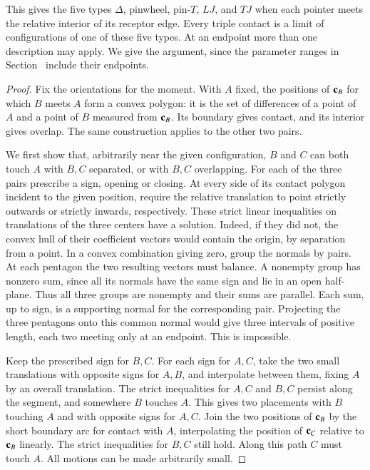 This gives the five types $\Delta$, pinwheel, pin-$T$, $LJ$, and $TJ$
when each pointer meets the relative interior of its receptor edge.
Every triple contact is a limit of configurations of one of these
five types. At an endpoint more than one description may apply.
We give the argument, since the parameter ranges in
Section~ include their endpoints.

\begin{proof}
Fix the orientations for the moment. With $A$ fixed, the positions of
${\mathbf c}_B$ for which $B$ meets $A$ form a convex polygon: it is the set
of differences of a point of $A$ and a point of $B$ measured from
${\mathbf c}_B$. Its boundary gives contact, and its interior gives overlap.
The same construction applies to the other two pairs.

We first show that, arbitrarily near the given configuration, $B$ and
$C$ can both touch $A$ with $B,C$ separated, or with $B,C$ overlapping.
For each of the three pairs prescribe a sign, opening or closing.
At every side of its contact polygon incident to the given position,
require the relative translation to point strictly outwards or strictly
inwards, respectively. These strict linear inequalities on translations
of the three centers have a solution. Indeed, if they did not, the
convex hull of their coefficient vectors would contain the origin, by
separation from a point. In a convex combination giving zero, group
the normals by pairs. At each pentagon the two resulting vectors must
balance. A nonempty group has nonzero sum, since all its normals have
the same sign and lie in an open half-plane. Thus all three groups
are nonempty and their sums are parallel. Each sum, up to sign, is a
supporting normal for the corresponding pair. Projecting the three
pentagons onto this common normal would give three intervals of
positive length, each two meeting only at an endpoint. This is
impossible.

Keep the prescribed sign for $B,C$. For each sign for $A,C$, take
the two small translations with opposite signs for $A,B$, and
interpolate between them, fixing $A$ by an overall translation.
The strict inequalities for $A,C$ and $B,C$ persist along the segment,
and somewhere $B$ touches $A$. This gives two placements with $B$
touching $A$ and with opposite signs for $A,C$. Join the two positions
of ${\mathbf c}_B$ by the short boundary arc for contact with $A$, interpolating
the position of ${\mathbf c}_C$ relative to ${\mathbf c}_B$ linearly. The strict
inequalities for $B,C$ still hold. Along this path $C$ must touch $A$.
All motions can be made arbitrarily small.


\end{proof}

